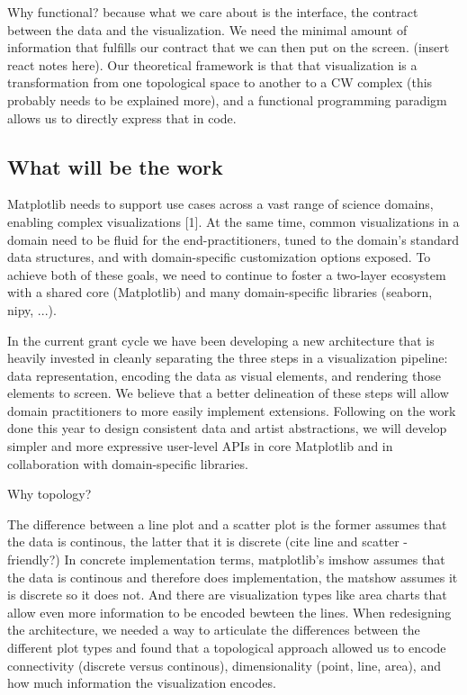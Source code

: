 \documentclass[letterpaper,onecolumn,titlepage]{Ythesis}
\begin{document}
 Why functional?
 because what we care about is the interface, the contract between the data and the visualization. We need the minimal amount of information that fulfills our contract that we can then put on the screen. (insert react notes here). Our theoretical framework is that that visualization is a transformation from one topological space to another to a CW complex (this probably needs to be explained more), and a functional programming paradigm allows us to directly express that in code. 

 \subsection{What will be the work}
 Matplotlib needs to support use cases across a vast range of science domains, enabling complex visualizations [1]. At the same time, common visualizations in a domain need to be fluid for the end-practitioners, tuned to the domain's standard data structures, and with domain-specific customization options exposed. To achieve both of these goals, we need to continue to foster a two-layer ecosystem with a shared core (Matplotlib) and many domain-specific libraries (seaborn, nipy, ...).

In the current grant cycle we have been developing a new architecture that is heavily invested in cleanly separating the three steps in a visualization pipeline: data representation, encoding the data as visual elements, and rendering those elements to screen. We believe that a better delineation of these steps will allow domain practitioners to more easily implement extensions. Following on the work done this year to design consistent data and artist abstractions, we will develop simpler and more expressive user-level APIs in core Matplotlib and in collaboration with domain-specific libraries. 



 Why topology?

 The difference between a line plot and a scatter plot is the former assumes that the data is continous, the latter that it is discrete (cite line and scatter - friendly?) In concrete implementation terms, matplotlib's imshow assumes that the data is continous and therefore does implementation, the matshow assumes it is discrete so it does not. And there are visualization types like area charts that allow even more information to be encoded bewteen the lines. When redesigning the architecture, we needed a way to articulate the differences between the different plot types and found that a topological approach allowed us to encode connectivity (discrete versus continous), dimensionality (point, line, area), and how much information the visualization encodes. 
\end{document}

